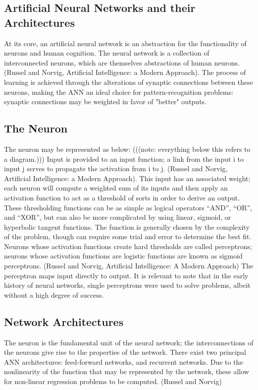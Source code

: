 \documentclass[11pt]{article}
\begin{document}
\subsection{Artificial Neural Networks and their Architectures}
At its core, an artificial neural network is an abstraction for the functionality of neurons and human cognition. The neural network is a collection of interconnected neurons, which are themselves abstractions of human neurons. (Russel and Norvig, Artificial Intelligence: a Modern Approach). The process of learning is achieved through the alterations of synaptic connections between these neurons, making the ANN an ideal choice for pattern-recognition problems: synaptic connections may be weighted in favor of "better" outputs.

\subsection{The Neuron}
The neuron may be represented as below:
(((note: everything below this refers to a diagram.)))
Input is provided to an input function; a link from the input i to input j serves to propagate the activation from i to j. (Russel and Norvig, Artificial Intelligence: a Modern Approach). This input has an associated weight; each neuron will compute a weighted sum of its inputs and then apply an activation function to act as a threshold of sorts in order to derive an output. These thresholding functions can be as simple as logical operators “AND”, “OR”, and “XOR”, but can also be more complicated by using linear, sigmoid, or hyperbolic tangent functions. The function is generally chosen by the complexity of the problem, though can require some trial and error to determine the best fit.  Neurons whose activation functions create hard thresholds are called perceptrons; neurons whose activation functions are logistic functions are known as sigmoid perceptrons. (Russel and Norvig, Artificial Intelligence: A Modern Approach) The perceptron maps input directly to output. It is relevant to note that in the early history of neural networks, single perceptrons were used to solve problems, albeit without a high degree of success. 

\subsection{Network Architectures}
The neuron is the fundamental unit of the neural network; the interconnections of the neurons give rise to the properties of the network. There exist two principal ANN architectures: feed-forward networks, and recurrent networks. Due to the nonlinearity of the function that may be represented by the network, these allow for non-linear regression problems to be computed. (Russel and Norvig)
\end{document}

